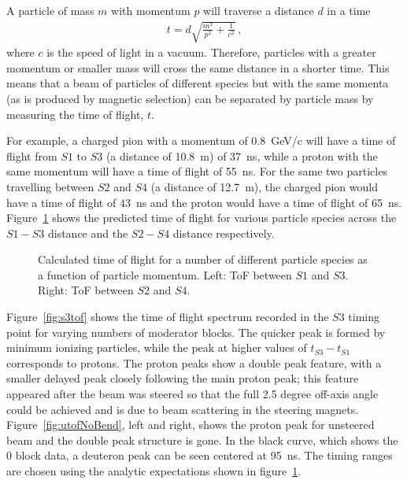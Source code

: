 A particle of mass $m$ with momentum $p$ will traverse a distance $d$ in a time
\begin{align}
  t = d \sqrt{\frac{m^2}{p^2} + \frac{1}{c^2}} \,, 
\end{align}
where $c$ is the speed of light in a vacuum.
Therefore, particles with a greater momentum or smaller mass will cross the same distance in a shorter time.
This means that a beam of particles of different species but with the same momenta (as is produced by magnetic selection) can be separated by particle mass by measuring the time of flight, $t$.

For example, a charged pion with a momentum of 0.8~GeV/c will have a time of flight from $\mathit{S1}$ to $\mathit{S3}$ (a distance of 10.8~m) of 37~ns, while a proton with the same momentum will have a time of flight of 55~ns.
For the same two particles travelling between $\mathit{S2}$ and $\mathit{S4}$ (a distance of 12.7~m), the charged pion would have a time of flight of 43~ns and the proton would have a time of flight of 65~ns.
Figure~\ref{fig:s1s3PredTimes} shows the predicted time of flight for various particle species across the $\mathit{S1}-\mathit{S3}$ distance and the $\mathit{S2}-\mathit{S4}$ distance respectively.

\begin{figure}[ht]
  
  \begin{minipage}[t]{0.49\textwidth}
    \begin{adjustbox}{max totalsize={\textwidth}{.5\textheight},center}
      
    \end{adjustbox}
  \end{minipage}
  \hfill
  \begin{minipage}[t]{0.49\textwidth}
    \begin{adjustbox}{max totalsize={\textwidth}{.5\textheight},center}
      
    \end{adjustbox}
  \end{minipage}
   \caption{\label{fig:s1s3PredTimes}Calculated time of flight for a number of different particle species as a function of particle momentum. Left: ToF between $\mathit{S1}$ and $\mathit{S3}$. Right: ToF between $\mathit{S2}$ and $\mathit{S4}$.}
\end{figure}

Figure~\ref{fig:s3tof} shows the time of flight spectrum recorded in the $\mathit{S3}$ timing point for varying numbers of moderator blocks.
The quicker peak is formed by minimum ionizing particles, while the peak at higher values of $\mathit{t_{S3}} - \mathit{t_{S1}}$ corresponds to protons.
The proton peaks show a double peak feature, with a smaller delayed peak closely following the main proton peak; this feature appeared after the beam was steered so that the full 2.5 degree off-axis angle could be achieved and is due to beam scattering in the steering magnets.
Figure~\ref{fig:utofNoBend}, left and right, shows the proton peak for unsteered beam and the double peak structure is gone.
In the black curve, which shows the 0 block data, a deuteron peak can be seen centered at 95~ns.
The timing ranges are chosen using the analytic expectations shown in figure~\ref{fig:s1s3PredTimes}.

